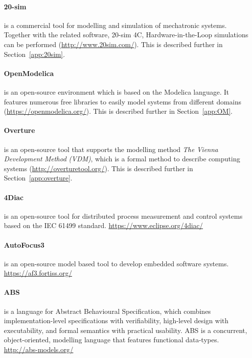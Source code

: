\paragraph{20-sim} is a commercial tool for modelling and simulation of mechatronic systems. Together with the related software, 20-sim 4C, Hardware-in-the-Loop simulations can be performed (\url{http://www.20sim.com/}). This is described further in Section~\ref{app:20sim}.

\paragraph{OpenModelica} is an open-source environment which is based on the Modelica language. It features numerous free libraries to easily model systems from different domains (\url{https://openmodelica.org/}). This is described further in Section~\ref{app:OM}.

\paragraph{Overture} is an open-source tool that supports the modelling method \textit{The Vienna Development Method (VDM)}, which is a formal method to describe computing systems (\url{http://overturetool.org/}). This is described further in Section~\ref{app:overture}.

\paragraph{4Diac} is an open-source tool for distributed process measurement and control systems based on the IEC 61499 standard. \url{https://www.eclipse.org/4diac/}

\paragraph{AutoFocus3} is an open-source model based tool to develop embedded software systems. \url{https://af3.fortiss.org/}


\paragraph{ABS} is a language for Abstract Behavioural Specification, which combines implementation-level specifications with verifiability, high-level design with executability, and formal semantics with practical usability. ABS is a concurrent, object-oriented, modelling language that features functional data-types. \url{http://abs-models.org/}

